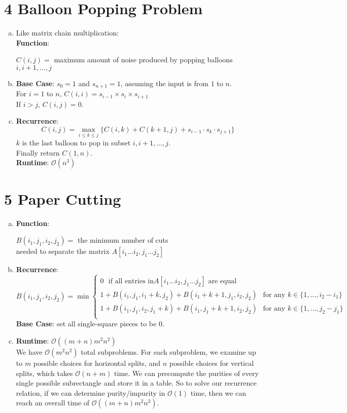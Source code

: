 \documentclass[11pt]{article}
\def\rt{\textbf{Runtime}: }
\def\ft{\textbf{Function}: }
\def\bc{\textbf{Base Case}: }
\def\rc{\textbf{Recurrence}: }
\newenvironment{qparts}{\begin{enumerate}[(a)]}{\end{enumerate}}
\begin{document}
	\section*{4 Balloon Popping Problem}
	\begin{qparts}
		\item Like matrix chain multiplication:\\
		\ft 
		\begin{center}
			$C(i, j) = $ maximum amount of noise produced by popping balloons  $i, i+1, \dots, j$
		\end{center}
		
		\item
		\bc $s_0 = 1$ and $s_{n+1} = 1$, assuming the input is from $1$ to $n$.\\
		For $i = 1$ to $n$, $C(i, i) = s_{i-1} \times s_{i} \times s_{i+1}$\\
		If $i > j$, $C(i, j) = 0$.
		
		\item
		\rc
		$$C(i, j) = \max_{i \leq k \leq j}\{C(i, k) + C(k+1, j) + s_{i-1}\cdot s_k\cdot s_{j+1}\}$$
		$k$ is the last balloon to pop in subset $i, i+1, \dots, j$.\\
		Finally return $C(1, n)$.\\
		\rt $\mathcal{O}(n^3)$
	\end{qparts}

	\section*{5  Paper Cutting}
	\begin{qparts}
		\item \ft 
		\begin{center}
			$B(i_1, j_1, i_2, j_2) = $ the minimum number of cuts \\
			needed to separate the matrix $A[i_1\dots i_2, j_1\dots j_2]$
		\end{center}
		
		\item \rc
		$$B(i_1, j_1, i_2, j_2) = \min \begin{cases}
			0  \ \ \  \text{if all entries in} A[i_1\dots i_2, j_1\dots j_2] \text{ are equal}\\
			1 + B(i_1, j_1, i_1+k, j_2) + B(i_1+k+1, j_1, i_2, j_2) & \text{for any }k \in \{1, \dots , i_2-i_1\}\\
			 1 + B(i_1, j_1, i_2, j_1+k) + B(i_1, j_1+k +1, i_2, j_2) & \text{for any }k \in \{1, \dots , j_2-j_1\}\\
		\end{cases}$$
		\bc set all single-square pieces to be $0$.
		
		\item \rt $\mathcal{O}((m+n)m^2n^2)$\\
		We have $\mathcal{O}(m^2n^2)$ total subproblems.  For each subproblem, we examine up to $m$ possible choices for horizontal splits, and $n$ possible choices for vertical splits, which takes $\mathcal{O}(n + m)$ time. We can precompute the purities of every single possible subrectangle and store it in a table. So to solve our recurrence relation, if we can determine purity/impurity in $\mathcal{O}(1)$ time, then we can reach an overall time of $\mathcal{O}((m+n)m^2n^2)$.
	\end{qparts}
\end{document}
